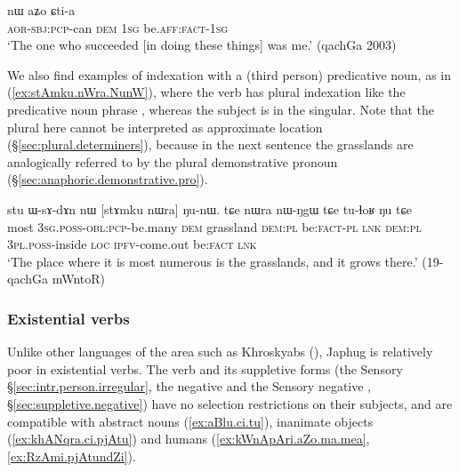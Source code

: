 \begin{exe}
\ex \label{ex:pWkWcha.nW}
\gll [pɯ-kɯ-cʰa] nɯ aʑo ɕti-a \\
\textsc{aor}-\textsc{sbj}:\textsc{pcp}-can \textsc{dem} \textsc{1sg} be.\textsc{aff}:\textsc{fact}-\textsc{1sg} \\
\glt `The one who succeeded [in doing these things] was me.' (qachGa 2003)
\end{exe}

We also find examples of indexation with a (third person) predicative noun, as in (\ref{ex:stAmku.nWra.NunW}), where the verb has plural indexation like the predicative noun phrase , whereas the subject is in the singular. Note that the plural  here cannot be interpreted as approximate location (§\ref{sec:plural.determiners}), because in the next sentence the grasslands are analogically referred to by the plural demonstrative pronoun  (§\ref{sec:anaphoric.demonstrative.pro}).

\begin{exe}
\ex \label{ex:stAmku.nWra.NunW}
\gll  stu ɯ-sɤ-dɤn nɯ [stɤmku nɯra] ŋu-nɯ. tɕe nɯra nɯ-ŋgɯ tɕe tu-ɬoʁ ŋu tɕe \\
most \textsc{3sg}.\textsc{poss}-\textsc{obl}:\textsc{pcp}-be.many \textsc{dem} grassland \textsc{dem}:\textsc{pl} be:\textsc{fact}-\textsc{pl} \textsc{lnk} \textsc{dem}:\textsc{pl} \textsc{3pl}.\textsc{poss}-inside \textsc{loc} \textsc{ipfv}-come.out be:\textsc{fact} \textsc{lnk} \\
\glt `The place where it is most numerous is the grasslands, and it grows there.' (19-qachGa mWntoR)
\end{exe}

\subsubsection{Existential verbs} \label{sec:existential.basic}
Unlike other languages of the area such as Khroskyabs (\citealt[250--252]{lai17khroskyabs}), Japhug is relatively poor in existential verbs. The verb  and its suppletive forms (the Sensory  §\ref{sec:intr.person.irregular}, the negative  and the Sensory negative ,  §\ref{sec:suppletive.negative}) have no selection restrictions on their  subjects, and are compatible  with abstract nouns (\ref{ex:aBlu.ci.tu}), inanimate objects (\ref{ex:khANqra.ci.pjAtu}) and  humans (\ref{ex:kWnApAri.aZo.ma.mea}, \ref{ex:RzAmi.pjAtundZi}).

